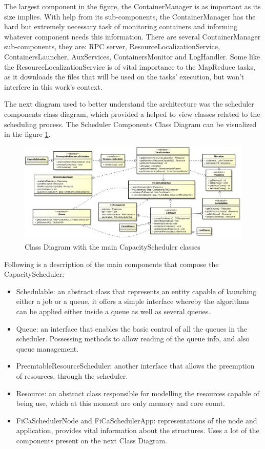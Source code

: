 The largest component in the figure, the ContainerManager is as important as its size implies. With help from its sub-components, the ContainerManager has the hard but extremely necessary task of monitoring containers and informing whatever component needs this information. There are several ContainerManager sub-components, they are: RPC server, ResourceLocalizationService, ContainersLauncher, AuxServices, ContainersMonitor and LogHandler. Some like the ResourceLocalizationService is of vital importance to the MapReduce tasks, as it downloads the files that will be used on the tasks' execution, but won't interfere in this work's context.

The next diagram used to better understand the architecture was the scheduler components class diagram, which provided a helped to view classes related to the scheduling process. The Scheduler Components Class Diagram can be visualized in the figure \ref{fig:SchedCD}.

\begin{figure}[hbtn]
   \renewcommand{\figurename}{Figure}
   \centering
   \includegraphics[width=15cm]{figuras/Figura01-ClassDiagram.png}
   \caption{Class Diagram with the main CapacityScheduler classes}
   \label{fig:SchedCD}
\end{figure}

Following is a description of the main components that compose the CapacityScheduler:
\begin{itemize}
	\item Schedulable: an abstract class that represents an entity capable of launching either a job or a queue, it offers a simple interface whereby the algorithms can be applied either inside a queue as well as several queues.
	\item Queue: an interface that enables the basic control of all the queues in the scheduler. Possessing methods to allow reading of the queue info, and also queue management.
	\item PreemtableResourceScheduler: another interface that allows the preemption of resources, through the scheduler.
	\item Resource: an abstract class responsible for modelling the resources capable of being use, which at this moment are only memory and core count.
	\item FiCaSchedulerNode and FiCaSchedulerApp: representations of the node and application, provides vital information about the structures. Uses a lot of the components present on the next Class Diagram.
\end{itemize}

